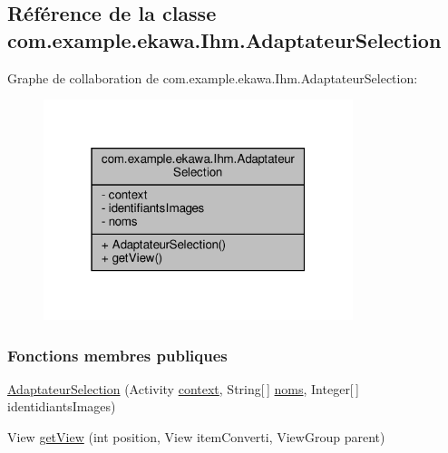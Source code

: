 \hypertarget{classcom_1_1example_1_1ekawa_1_1_ihm_1_1_adaptateur_selection}{}\subsection{Référence de la classe com.\+example.\+ekawa.\+Ihm.\+Adaptateur\+Selection}
\label{classcom_1_1example_1_1ekawa_1_1_ihm_1_1_adaptateur_selection}


Graphe de collaboration de com.\+example.\+ekawa.\+Ihm.\+Adaptateur\+Selection\+:\nopagebreak
\begin{figure}[H]
\begin{center}
\leavevmode
\includegraphics[width=256pt]{classcom_1_1example_1_1ekawa_1_1_ihm_1_1_adaptateur_selection__coll__graph}
\end{center}
\end{figure}
\subsubsection*{Fonctions membres publiques}
\begin{DoxyCompactItemize}
\item 
\hyperlink{classcom_1_1example_1_1ekawa_1_1_ihm_1_1_adaptateur_selection_a41746ec1a290651b4cacb0894a32307b}{Adaptateur\+Selection} (Activity \hyperlink{classcom_1_1example_1_1ekawa_1_1_ihm_1_1_adaptateur_selection_a9605d2f9384114fcb57da610a7071676}{context}, String\mbox{[}$\,$\mbox{]} \hyperlink{classcom_1_1example_1_1ekawa_1_1_ihm_1_1_adaptateur_selection_a5d71a6dd60ad53aa95ae59bb094b4002}{noms}, Integer\mbox{[}$\,$\mbox{]} identidiants\+Images)
\item 
View \hyperlink{classcom_1_1example_1_1ekawa_1_1_ihm_1_1_adaptateur_selection_a9c763267cefd3c67f449b8a797cdf916}{get\+View} (int position, View item\+Converti, View\+Group parent)
\end{DoxyCompactItemize}
